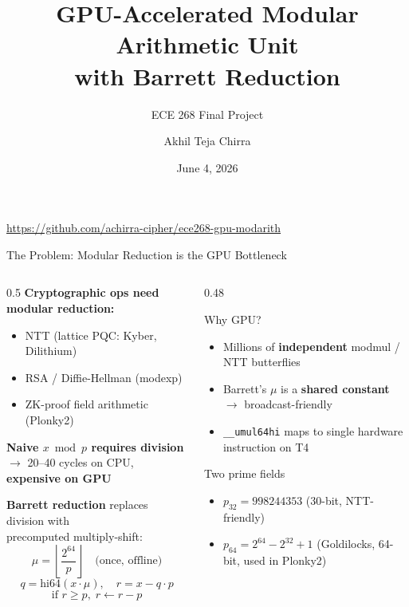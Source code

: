 \documentclass[aspectratio=169,10pt]{beamer}
\title[GPU Barrett Modular Arithmetic]{GPU-Accelerated Modular Arithmetic Unit\\with Barrett Reduction}
\subtitle{ECE 268 Final Project}
\author{Akhil Teja Chirra}
\institute{UC San Diego}
\date{June 4, 2026}
\begin{document}
\begin{frame}
  \titlepage
  \begin{center}
    \small\url{https://github.com/achirra-cipher/ece268-gpu-modarith}
  \end{center}
\end{frame}

\begin{frame}{The Problem: Modular Reduction is the GPU Bottleneck}

\begin{columns}
\begin{column}{0.5\textwidth}
  \textbf{Cryptographic ops need modular reduction:}
  \begin{itemize}
    \item NTT (lattice PQC: Kyber, Dilithium)
    \item RSA / Diffie-Hellman (modexp)
    \item ZK-proof field arithmetic (Plonky2)
  \end{itemize}
  \vspace{0.5em}
  \textbf{Naive $x \bmod p$ requires division}\\
  $\rightarrow$ 20--40 cycles on CPU, \textbf{expensive on GPU}

  \vspace{1em}
  \textbf{Barrett reduction} replaces division with\\
  precomputed multiply-shift:
  \[
    \mu = \left\lfloor \frac{2^{64}}{p} \right\rfloor \quad \text{(once, offline)}
  \]
  \[
    q = \mathrm{hi64}(x \cdot \mu), \quad r = x - q \cdot p
  \]
  \[
    \text{if } r \ge p,\; r \leftarrow r - p
  \]
\end{column}
\begin{column}{0.48\textwidth}
  \begin{block}{Why GPU?}
    \begin{itemize}
      \item Millions of \textbf{independent} modmul / NTT butterflies
      \item Barrett's $\mu$ is a \textbf{shared constant} $\rightarrow$ broadcast-friendly
      \item \texttt{\_\_umul64hi} maps to single hardware instruction on T4
    \end{itemize}
  \end{block}
  \vspace{0.4em}
  \begin{block}{Two prime fields}
    \begin{itemize}
      \item $p_{32} = 998244353$ (30-bit, NTT-friendly)
      \item $p_{64} = 2^{64}{-}2^{32}{+}1$ (Goldilocks, 64-bit, used in Plonky2)
    \end{itemize}
  \end{block}
\end{column}
\end{columns}
\end{frame}
\end{document}

